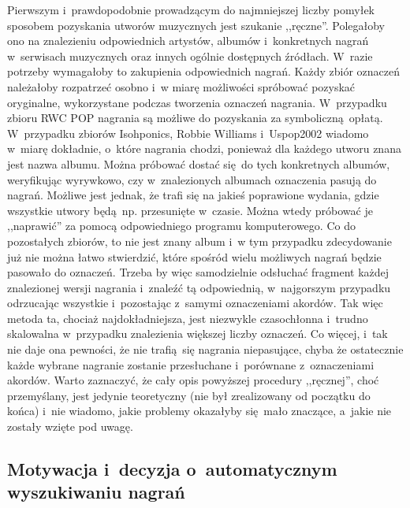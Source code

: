 Pierwszym i~prawdopodobnie prowadzącym do najmniejszej liczby pomyłek sposobem pozyskania utworów muzycznych jest szukanie ,,ręczne''. Polegałoby ono na znalezieniu odpowiednich artystów, albumów i~konkretnych nagrań w~serwisach muzycznych oraz innych ogólnie dostępnych źródłach. W~razie potrzeby wymagałoby to zakupienia odpowiednich nagrań. Każdy zbiór oznaczeń należałoby rozpatrzeć osobno i~w miarę możliwości spróbować pozyskać oryginalne, wykorzystane podczas tworzenia oznaczeń nagrania. W~przypadku zbioru RWC POP nagrania są możliwe do pozyskania za symboliczną opłatą. W~przypadku zbiorów Isohponics, Robbie Williams i~Uspop2002 wiadomo w~miarę dokładnie, o~które nagrania chodzi, ponieważ dla każdego utworu znana jest nazwa albumu. Można próbować dostać się do tych konkretnych albumów, weryfikując wyrywkowo, czy w~znalezionych albumach oznaczenia pasują do nagrań. Możliwe jest jednak, że trafi się na jakieś poprawione wydania, gdzie wszystkie utwory będą np. przesunięte w~czasie. Można wtedy próbować je ,,naprawić'' za pomocą odpowiedniego programu komputerowego. Co do pozostałych zbiorów, to nie jest znany album i~w tym przypadku zdecydowanie już nie można łatwo stwierdzić, które spośród wielu możliwych nagrań będzie pasowało do oznaczeń. Trzeba by więc samodzielnie odsłuchać fragment każdej znalezionej wersji nagrania i~znaleźć tą odpowiednią, w~najgorszym przypadku odrzucając wszystkie i~pozostając z~samymi oznaczeniami akordów. Tak więc metoda ta, chociaż najdokładniejsza, jest niezwykle czasochłonna i~trudno skalowalna w~przypadku znalezienia większej liczby oznaczeń. Co więcej, i~tak nie daje ona pewności, że nie trafią się nagrania niepasujące, chyba że ostatecznie każde wybrane nagranie zostanie przesłuchane i~porównane z~oznaczeniami akordów. Warto zaznaczyć, że cały opis powyższej procedury ,,ręcznej'', choć przemyślany, jest jedynie teoretyczny (nie był zrealizowany od początku do końca) i~nie wiadomo, jakie problemy okazałyby się mało znaczące, a~jakie nie zostały wzięte pod uwagę. 

\subsection{Motywacja i~decyzja o~automatycznym wyszukiwaniu nagrań}

